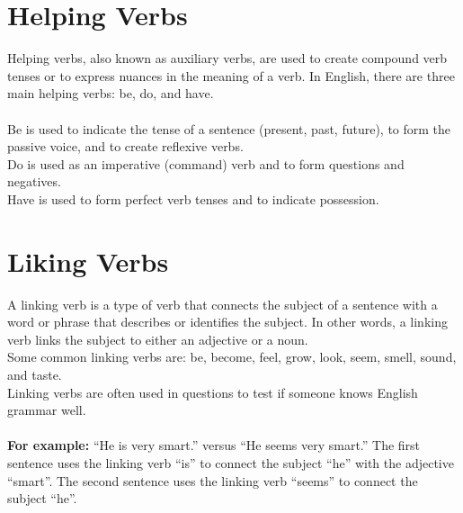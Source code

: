 \section{Helping Verbs}
Helping verbs, also known as auxiliary verbs, are used to create compound verb tenses or to express nuances in the meaning of a verb. 
In English, there are three main helping verbs: be, do, and have.\\\\
Be is used to indicate the tense of a sentence (present, past, future), to form the passive voice, and to create reflexive verbs.\\
Do is used as an imperative (command) verb and to form questions and negatives.\\
Have is used to form perfect verb tenses and to indicate possession.

\newpage
\section{Liking Verbs}
A linking verb is a type of verb that connects the subject of a sentence with a word or phrase that describes or identifies the subject. In other words, a linking verb links the subject to either an adjective or a noun.\\
Some common linking verbs are: be, become, feel, grow, look, seem, smell, sound, and taste.\\
Linking verbs are often used in questions to test if someone knows English grammar well.\\\\
\textbf{For example:} “He is very smart.” versus “He seems very smart.” The first sentence uses the linking verb “is” to connect the subject “he” with the adjective “smart”. The second sentence uses the linking verb “seems” to connect the subject “he”.

